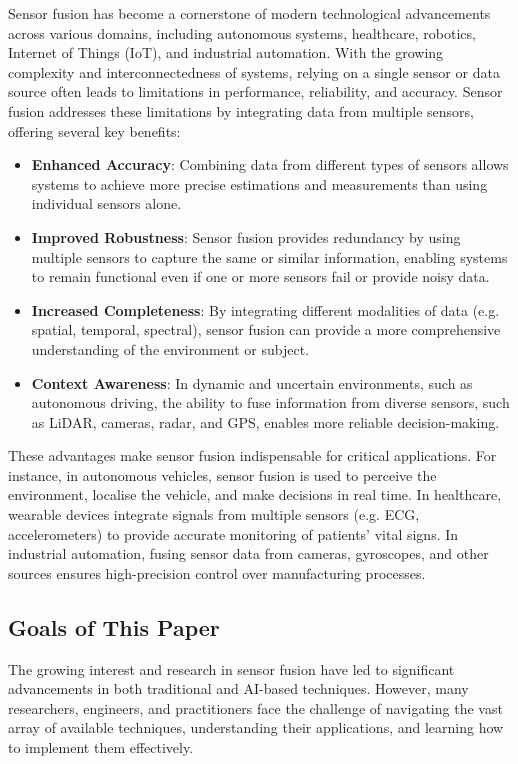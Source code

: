 \documentclass[journal]{IEEEtran}
\begin{document}
Sensor fusion has become a cornerstone of modern technological advancements across various domains, including autonomous systems, healthcare, robotics, Internet of Things (IoT), and industrial automation. With the growing complexity and interconnectedness of systems, relying on a single sensor or data source often leads to limitations in performance, reliability, and accuracy. Sensor fusion addresses these limitations by integrating data from multiple sensors, offering several key benefits:
\begin{itemize}
    \item \textbf{Enhanced Accuracy}: Combining data from different types of sensors allows systems to achieve more precise estimations and measurements than using individual sensors alone.
    \item \textbf{Improved Robustness}: Sensor fusion provides redundancy by using multiple sensors to capture the same or similar information, enabling systems to remain functional even if one or more sensors fail or provide noisy data.
    \item \textbf{Increased Completeness}: By integrating different modalities of data (e.g. spatial, temporal, spectral), sensor fusion can provide a more comprehensive understanding of the environment or subject.
    \item \textbf{Context Awareness}: In dynamic and uncertain environments, such as autonomous driving, the ability to fuse information from diverse sensors, such as LiDAR, cameras, radar, and GPS, enables more reliable decision-making.
\end{itemize}

These advantages make sensor fusion indispensable for critical applications. For instance, in autonomous vehicles, sensor fusion is used to perceive the environment, localise the vehicle, and make decisions in real time. In healthcare, wearable devices integrate signals from multiple sensors (e.g. ECG, accelerometers) to provide accurate monitoring of patients' vital signs. In industrial automation, fusing sensor data from cameras, gyroscopes, and other sources ensures high-precision control over manufacturing processes.

\subsection{Goals of This Paper}

The growing interest and research in sensor fusion have led to significant advancements in both traditional and AI-based techniques. However, many researchers, engineers, and practitioners face the challenge of navigating the vast array of available techniques, understanding their applications, and learning how to implement them effectively.
\end{document}
